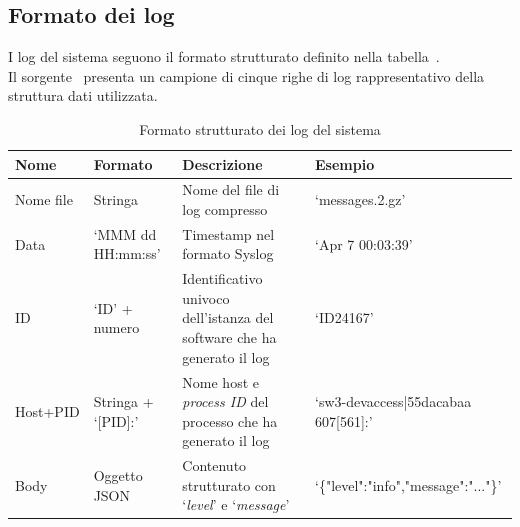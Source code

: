 \documentclass[12pt,twoside]{report}
\begin{document}
\clearpage

\subsection{Formato dei log}
\label{subsec:formato_log}

I log del sistema seguono il formato strutturato definito nella tabella~.\\
Il sorgente~ presenta un campione di cinque righe di log rappresentativo della struttura dati utilizzata.

\begin{table}[h!]
    \centering
    \begin{tabular}{|p{}|p{}|p{}|p{}|}
        \hline
        \textbf{Nome} & \textbf{Formato}   & \textbf{Descrizione}                                                    & \textbf{Esempio}                    \\
        \hline
        Nome file     & Stringa            & Nome del file di log compresso                                          & `messages.2.gz'                     \\
        \hline
        Data          & `MMM dd HH:mm:ss'  & Timestamp nel formato Syslog                                            & `Apr  7 00:03:39'                   \\
        \hline
        ID            & `ID' + numero      & Identificativo univoco dell'istanza del software che ha generato il log & `ID24167'                           \\
        \hline
        Host+PID      & Stringa + `[PID]:' & Nome host e \textit{process ID} del processo che ha generato il log     & `sw3-devaccess|55dacabaa 607[561]:' \\
        \hline
        Body          & Oggetto JSON       & Contenuto strutturato con `\textit{level}' e `\textit{message}'         & `\{"level":"info",\newline"message":"..."\}' \\
        \hline
    \end{tabular}
    \caption{Formato strutturato dei log del sistema}
    \label{tab:formato_log}
\end{table}


\end{document}
